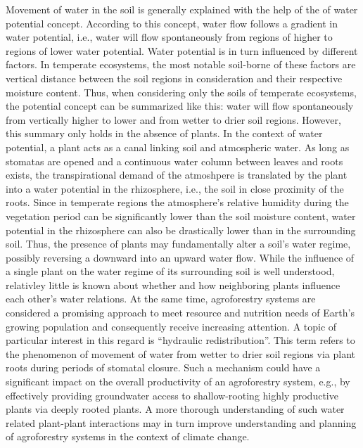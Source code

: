 Movement of water in the soil is generally explained with the help of the of water potential concept.
According to this concept, water flow follows a gradient in water potential, i.e., water will flow spontaneously from regions of higher to regions of lower water potential.
Water potential is in turn influenced by different factors.
In temperate ecosystems, the most notable soil-borne of these factors are vertical distance between the soil regions in consideration and their respective moisture content.
Thus, when considering only the soils of temperate ecosystems, the potential concept can be summarized like this:  water will flow spontaneously from vertically higher to lower and from wetter to drier soil regions.
However, this summary only holds in the absence of plants.
In the context of water potential, a plant acts as a canal linking soil and atmospheric water.
As long as stomatas are opened and a continuous water column between leaves and roots exists, the transpirational demand of the atmoshpere is translated by the plant into a water potential in the rhizosphere, i.e., the soil in close proximity of the roots.
Since in temperate regions the atmosphere’s relative humidity during the vegetation period can be significantly lower than the soil moisture content, water potential in the rhizosphere can also be drastically lower than in the surrounding soil.
Thus, the presence of plants may fundamentally alter a soil’s water regime, possibly reversing a downward into an upward water flow.
While the influence of a single plant on the water regime of its surrounding soil is well understood, relativley little is known about whether and how neighboring plants influence each other’s water relations.
At the same time, agroforestry systems are considered a promising approach to meet resource and nutrition needs of Earth’s growing population and consequently receive increasing attention.
A topic of particular interest in this regard is ``hydraulic redistribution''.
This term refers to the phenomenon of movement of water from wetter to drier soil regions via plant roots during periods of stomatal closure.
Such a mechanism could have a significant impact on the overall productivity of an agroforestry system, e.g., by effectively providing groundwater access to shallow-rooting highly productive plants via deeply rooted plants.
A more thorough understanding of such water related plant-plant interactions may in turn improve understanding and planning of agroforestry systems in the context of climate change.

